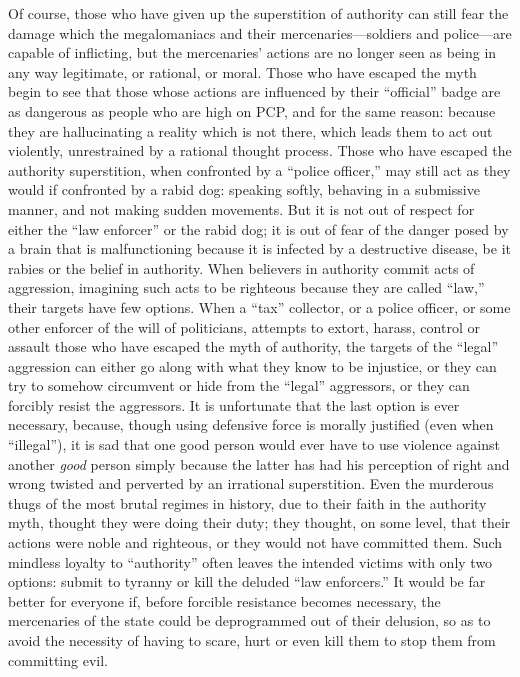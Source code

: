 \documentclass{book}
\begin{document}
Of course, those who have given up the superstition of authority can still fear the damage which the megalomaniacs and their mercenaries---soldiers and police---are capable of inflicting, but the mercenaries' actions are no longer seen as being in any way legitimate, or rational, or moral. Those who have escaped the myth begin to see that those whose actions are influenced by their \enquote{official} badge are as dangerous as people who are high on PCP, and for the same reason: because they are hallucinating a reality which is not there, which leads them to act out violently, unrestrained by a rational thought process. Those who have escaped the authority superstition, when confronted by a \enquote{police officer,} may still act as they would if confronted by a rabid dog: speaking softly, behaving in a submissive manner, and not making sudden movements. But it is not out of respect for either the \enquote{law enforcer} or the rabid dog; it is out of fear of the danger posed by a brain that is malfunctioning because it is infected by a destructive disease, be it rabies or the belief in authority. When believers in authority commit acts of aggression, imagining such acts to be righteous because they are called \enquote{law,} their targets have few options. When a \enquote{tax} collector, or a police officer, or some other enforcer of the will of politicians, attempts to extort, harass, control or assault those who have escaped the myth of authority, the targets of the \enquote{legal} aggression can either go along with what they know to be injustice, or they can try to somehow circumvent or hide from the \enquote{legal} aggressors, or they can forcibly resist the aggressors. It is unfortunate that the last option is ever necessary, because, though using defensive force is morally justified (even when \enquote{illegal}), it is sad that one good person would ever have to use violence against another \emph{good} person simply because the latter has had his perception of right and wrong twisted and perverted by an irrational superstition. Even the murderous thugs of the most brutal regimes in history, due to their faith in the authority myth, thought they were doing their duty; they thought, on some level, that their actions were noble and righteous, or they would not have committed them. Such mindless loyalty to \enquote{authority} often leaves the intended victims with only two options: submit to tyranny or kill the deluded \enquote{law enforcers.} It would be far better for everyone if, before forcible resistance becomes necessary, the mercenaries of the state could be deprogrammed out of their delusion, so as to avoid the necessity of having to scare, hurt or even kill them to stop them from committing evil.
\end{document}
